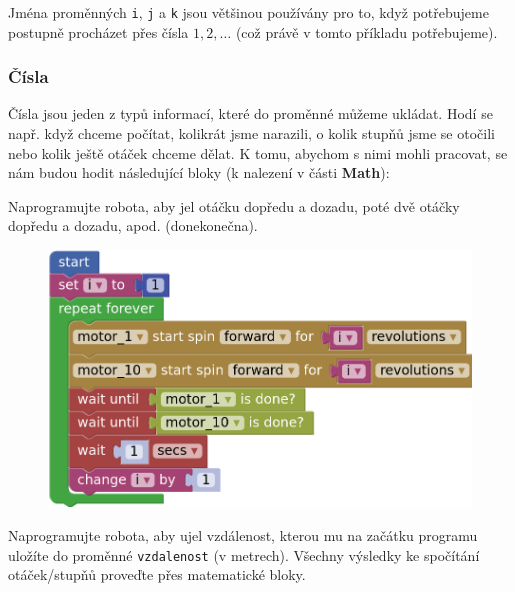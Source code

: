 \documentclass[../main.tex]{subfiles}
\begin{document}
	Jména proměnných \texttt{i}, \texttt{j} a \texttt{k} jsou většinou používány pro to, když potřebujeme postupně procházet přes čísla $1, 2, \ldots$ (což právě v tomto příkladu potřebujeme).

	\subsubsection{Čísla}\label{cha:math}
	Čísla jsou jeden z typů informací, které do proměnné můžeme ukládat. Hodí se např. když chceme počítat, kolikrát jsme narazili, o kolik stupňů jsme se otočili nebo kolik ještě otáček chceme dělat. K tomu, abychom s nimi mohli pracovat, se nám budou hodit následující bloky (k nalezení v části \textbf{Math}):
  
	\begin{itemize}
		\blockMathOperation
		\blockMathTest
		\blockMathValue
		\blockMathConstant
		\blockMathRandom
	\end{itemize}

	\begin{question}
		Naprogramujte robota, aby jel otáčku dopředu a dozadu, poté dvě otáčky dopředu a dozadu, apod. (donekonečna).
	\end{question}

	\begin{solution}
		\begin{figure}
			\centering
			\begin{minipage}{0.5\textwidth}
				\includegraphics[width=\linewidth]{Images/05/solsim.png}
			\end{minipage}
		\end{figure}
	\end{solution}

	\begin{question}
		Naprogramujte robota, aby ujel vzdálenost, kterou mu na začátku programu uložíte do proměnné \texttt{vzdalenost} (v metrech). Všechny výsledky ke spočítání otáček/stupňů proveďte přes matematické bloky.
	\end{question}
\end{document}
